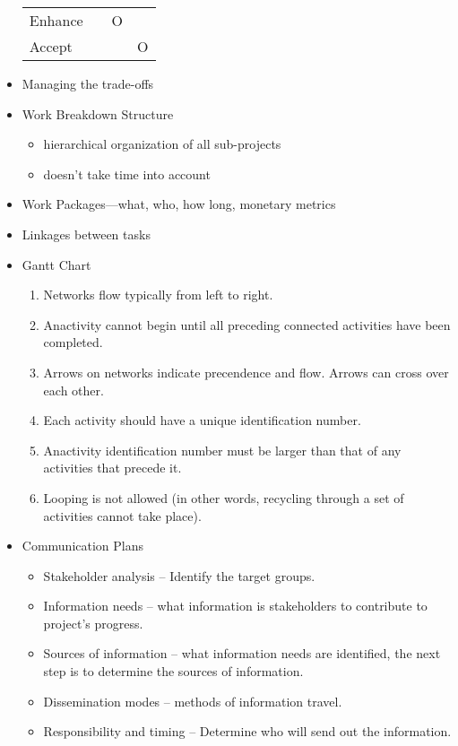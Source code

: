 \documentclass[8pt, letter]{extarticle}
\begin{document}
\begin{multicols}{2}
\begin{itemize}
\begin{tabular}{ l c c c }
                Enhance     &       &   O   &       \\
                Accept      &       &       &   O   \\
            \end{tabular}
        \item Managing the trade-offs
        \item Work Breakdown Structure
            \begin{itemize}
                \item hierarchical organization of all sub-projects
                \item doesn't take time into account
            \end{itemize}
        \item Work Packages—what, who, how long, monetary metrics
        \item Linkages between tasks
        \item Gantt Chart
            \begin{enumerate}
                \item Networks flow typically from left to right.
                \item Anactivity cannot begin until all preceding connected activities have been completed.
                \item Arrows on networks indicate precendence and flow. Arrows can cross over each other.
                \item Each activity should have a unique identification number.
                \item Anactivity identification number must be larger than that of any activities that precede it.
                \item Looping is not allowed (in other words, recycling through a set of activities cannot take place).
            \end{enumerate}
        \item Communication Plans
            \begin{itemize}
                \item Stakeholder analysis – Identify the target groups. 
                \item Information needs – what information is stakeholders to contribute to project's progress. 
                \item Sources of information – what information needs are identified, the next step is to determine the sources of information. 
                \item Dissemination modes – methods of information travel. 
                \item Responsibility and timing – Determine who will send out the information.
            \end{itemize}
    \end{itemize}


\end{multicols}
\end{document}
